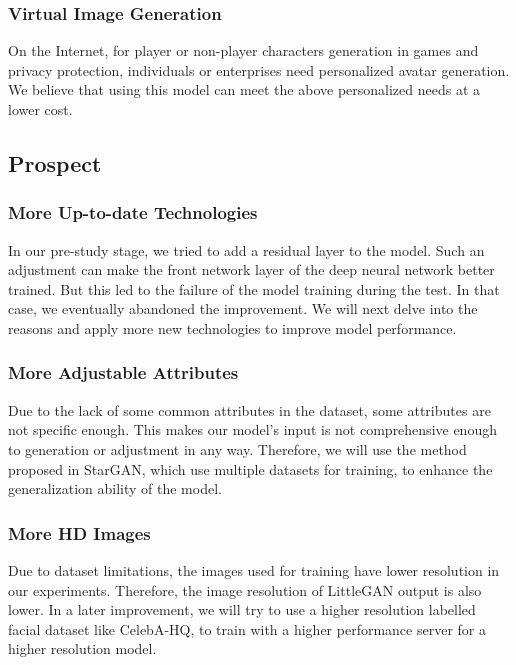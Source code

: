 \subsubsection*{Virtual Image Generation}
On the Internet, for player or non-player characters generation in games and privacy protection,
individuals or enterprises need personalized avatar generation.
We believe that using this model can meet the above personalized needs at a lower cost.

\subsection{Prospect}

\subsubsection*{More Up-to-date Technologies}

In our pre-study stage, we tried to add a residual layer to the model.
Such an adjustment can make the front network layer of the deep neural network better trained.
But this led to the failure of the model training during the test.
    In that case, we eventually abandoned the improvement.
We will next delve into the reasons and apply more new technologies to improve model performance.


\subsubsection*{More Adjustable Attributes}

Due to the lack of some common attributes in the dataset,
    some attributes are not specific enough.
This makes our model's input is not comprehensive enough to generation or adjustment in any way.
Therefore, we will use the method proposed in StarGAN,
    which use multiple datasets for training, to enhance the generalization ability of the model.


\subsubsection*{More HD Images}

Due to dataset limitations, the images used for training have lower resolution in our experiments.
Therefore, the image resolution of LittleGAN output is also lower.
In a later improvement, we will try to use a higher resolution labelled facial dataset like CelebA-HQ,
    to train with a higher performance server for a higher resolution model.


